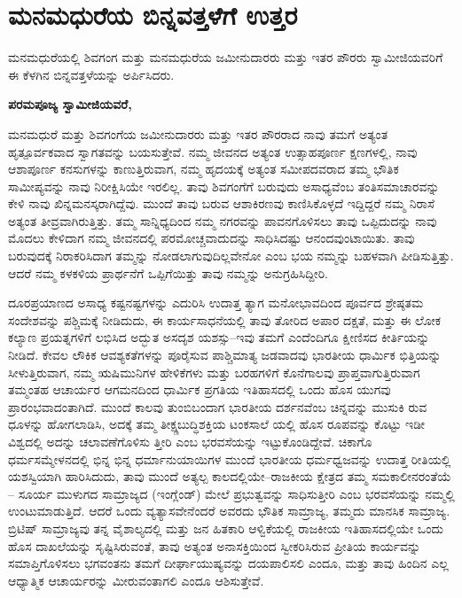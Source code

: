 
\chapter{ಮನಮಧುರೆಯ ಬಿನ್ನವತ್ತಳೆಗೆ ಉತ್ತರ}

ಮನಮಧುರೆಯಲ್ಲಿ ಶಿವಗಂಗ ಮತ್ತು ಮನಮಧುರೆಯ ಜಮೀನುದಾರರು ಮತ್ತು ಇತರ ಪೌರರು ಸ್ವಾಮೀಜಿಯವರಿಗೆ ಈ ಕೆಳಗಿನ ಬಿನ್ನವತ್ತಳೆಯನ್ನು ಅರ್ಪಿಸಿದರು. 

\textbf{ಪರಮಪೂಜ್ಯ ಸ್ವಾಮೀಜಿಯವರೆ, }

ಮನಮಧುರೆ ಮತ್ತು ಶಿವಗಂಗೆಯ ಜಮೀನುದಾರರು ಮತ್ತು ಇತರ ಪೌರರಾದ ನಾವು ತಮಗೆ ಅತ್ಯಂತ ಹೃತ್ಪೂರ್ವಕವಾದ ಸ್ವಾಗತವನ್ನು ಬಯಸುತ್ತೇವೆ. ನಮ್ಮ ಜೀವನದ ಅತ್ಯಂತ ಉತ್ಸಾಹಪೂರ್ಣ ಕ್ಷಣಗಳಲ್ಲಿ, ನಾವು ಆಶಾಪೂರ್ಣ ಕನಸು\-ಗಳನ್ನು ಕಾಣುತ್ತಿರುವಾಗ, ನಮ್ಮ ಹೃದಯಕ್ಕೆ ಅತ್ಯಂತ ಸಮೀಪದವರಾದ ತಮ್ಮ ಭೌತಿಕ ಸಾಮೀಪ್ಯವನ್ನು ನಾವು ನಿರೀಕ್ಷಿಸಿಯೇ ಇರಲಿಲ್ಲ. ತಾವು ಶಿವಗಂಗೆಗೆ ಬರುವುದು ಅಸಾಧ್ಯವೆಂಬ ತಂತಿಸಮಾಚಾರವನ್ನು ಕೇಳಿ ನಾವು ಖಿನ್ನಮನಸ್ಕರಾಗಿದ್ದೆವು. ಮುಂದೆ ತಾವು ಬರುವ ಆಶಾಕಿರಣವು ಕಾಣಿಸಿಕೊಳ್ಳದೆ ಇದ್ದಿದ್ದರೆ ನಮ್ಮ ನಿರಾಸೆ ಅತ್ಯಂತ ತೀವ್ರವಾಗಿರುತ್ತಿತ್ತು. ತಮ್ಮ ಸಾನ್ನಿಧ್ಯದಿಂದ ನಮ್ಮ ನಗರವನ್ನು ಪಾವನಗೊಳಿಸಲು ತಾವು ಒಪ್ಪಿದುದನ್ನು ನಾವು ಮೊದಲು ಕೇಳಿದಾಗ ನಮ್ಮ ಜೀವನದಲ್ಲಿ ಪರಮೋಚ್ಚವಾದುದನ್ನು ಸಾಧಿಸಿದಷ್ಟು ಆನಂದವುಂಟಾಯಿತು. ತಾವು ಬರುವುದಕ್ಕೆ ನಿರಾಕರಿಸಿದಾಗ ತಮ್ಮನ್ನು ನೋಡಲಾಗುವುದಿಲ್ಲವೇನೋ ಎಂಬ ಭಯ ನಮ್ಮನ್ನು ಬಹಳವಾಗಿ ಪೀಡಿಸುತ್ತಿತ್ತು. ಆದರೆ ನಮ್ಮ ಕಳಕಳಿಯ ಪ್ರಾರ್ಥನೆಗೆ ಒಪ್ಪಿಗೆಯಿತ್ತು ತಾವು ನಮ್ಮನ್ನು ಅನುಗ್ರಹಿಸಿದ್ದೀರಿ. 

ದೂರಪ್ರಯಾಣದ ಅಸಾಧ್ಯ ಕಷ್ಟನಷ್ಟಗಳನ್ನು ಎದುರಿಸಿ ಉದಾತ್ತ ತ್ಯಾಗ ಮನೋಭಾವದಿಂದ ಪೂರ್ವದ ಶ್ರೇಷ್ಠತಮ ಸಂದೇಶವನ್ನು ಪಶ್ಚಿಮಕ್ಕೆ ನೀಡಿದುದು, ಈ ಕಾರ್ಯಸಾಧನೆಯಲ್ಲಿ ತಾವು ತೋರಿದ ಅಪಾರ ದಕ್ಷತೆ, ಮತ್ತು ಈ ಲೋಕ ಕಲ್ಯಾಣ ಪ್ರಯತ್ನಗಳಿಗೆ ಲಭಿಸಿದ ಅದ್ಭುತ ಅಸದೃಶ ಯಶಸ್ಸು–ಇವು ತಮಗೆ ಎಂದೆಂದಿಗೂ ಕ್ಷೀಣಿಸದ ಕೀರ್ತಿಯನ್ನು ನೀಡಿದೆ. ಕೇವಲ ಲೌಕಿಕ ಆವಶ್ಯಕತೆಗಳನ್ನು ಪೂರೈಸುವ ಪಾಶ್ಚಿಮಾತ್ಯ ಜಡವಾದವು ಭಾರತೀಯ ಧಾರ್ಮಿಕ ಭಿತ್ತಿಯನ್ನು ಸೀಳುತ್ತಿರುವಾಗ, ನಮ್ಮ ಋಷಿಮುನಿಗಳ ಹೇಳಿಕೆಗಳು ಮತ್ತು ಬರಹಗಳಿಗೆ ಕೊನೆಗಾಲವು ಪ್ರಾಪ್ತವಾಗುತ್ತಿರುವಾಗ ತಮ್ಮಂತಹ ಆಚಾರ್ಯರ ಆಗಮನದಿಂದ ಧಾರ್ಮಿಕ ಪ್ರಗತಿಯ ಇತಿಹಾಸದಲ್ಲಿ ಒಂದು ಹೊಸ ಯುಗವು ಪ್ರಾರಂಭವಾದಂತಾಗಿದೆ. ಮುಂದೆ ಕಾಲವು ತುಂಬಿಬಂದಾಗ ಭಾರತೀಯ ದರ್ಶನವೆಂಬ ಚಿನ್ನವನ್ನು ಮುಸುಕಿ ರುವ ಧೂಳನ್ನು ಹೋಗಲಾಡಿಸಿ, ಅದಕ್ಕೆ ತಮ್ಮ ತೀಕ್ಷ್ಣಬುದ್ಧಿಶಕ್ತಿಯ ಟಂಕಸಾಲೆ ಯಲ್ಲಿ ಹೊಸ ರೂಪವನ್ನು ಕೊಟ್ಟು ಇಡೀ ವಿಶ್ವದಲ್ಲಿ ಅದನ್ನು ಚಲಾವಣೆಗೊಳಿಸು ತ್ತೀರಿ ಎಂಬ ಭರವಸೆಯನ್ನು ಇಟ್ಟುಕೊಂಡಿದ್ದೇವೆ. ಚಿಕಾಗೊ ಧರ್ಮಸಮ್ಮೇಳನದಲ್ಲಿ ಭಿನ್ನ ಭಿನ್ನ ಧರ್ಮಾನುಯಾಯಿಗಳ ಮುಂದೆ ಭಾರತೀಯ ಧರ್ಮಧ್ವಜವನ್ನು ಉದಾತ್ತ ರೀತಿಯಲ್ಲಿ ಯಶಸ್ವಿಯಾಗಿ ಹಾರಿಸಿದುದು, ತಾವು ಮುಂದೆ ಅತ್ಯಲ್ಪ ಕಾಲದಲ್ಲಿಯೇ–ರಾಜಕೀಯ ಕ್ಷೇತ್ರದ ತಮ್ಮ ಸಮ\-ಕಾಲೀನರಂತೆಯೆ – ಸೂರ್ಯ ಮುಳುಗದ ಸಾಮ್ರಾಜ್ಯದ (ಇಂಗ್ಲೆಂಡ್​) ಮೇಲೆ ಪ್ರಭುತ್ವವನ್ನು ಸಾಧಿಸುತ್ತೀರಿ ಎಂಬ ಭರವಸೆಯನ್ನು ನಮ್ಮಲ್ಲಿ ಉಂಟುಮಾಡುತ್ತಿದೆ. ಆದರೆ ಒಂದು ವ್ಯತ್ಯಾಸ\-ವೇನೆಂದರೆ ಅವರದು ಭೌತಿಕ ಸಾಮ್ರಾಜ್ಯ, ತಮ್ಮದು ಮಾನಸಿಕ ಸಾಮ್ರಾಜ್ಯ. ಬ್ರಿಟಿಷ್​ ಸಾಮ್ರಾಜ್ಯವು ತನ್ನ ವೈಶಾಲ್ಯದಲ್ಲಿ ಮತ್ತು ಜನ ಹಿತಕಾರಿ ಆಳ್ವಿಕೆಯಲ್ಲಿ ರಾಜಕೀಯ ಇತಿಹಾಸದಲ್ಲಿಯೇ ಒಂದು ಹೊಸ ದಾಖಲೆಯನ್ನು ಸೃಷ್ಟಿಸಿರುವಂತೆ, ತಾವು ಅತ್ಯಂತ ಅನಾಸಕ್ತಿಯಿಂದ ಸ್ವೀಕರಿಸಿರುವ ಪ್ರೀತಿಯ ಕಾರ್ಯವನ್ನು ಸಮಾಪ್ತಿಗೊಳಿಸಲು ಭಗವಂತನು ತಮಗೆ ದೀರ್ಘಾಯುಷ್ಯವನ್ನು ದಯಪಾಲಿಸಲಿ ಎಂದೂ, ಮತ್ತು ತಾವು ಹಿಂದಿನ ಎಲ್ಲ ಆಧ್ಯಾತ್ಮಿಕ ಆಚಾರ್ಯರನ್ನು ಮೀರುವಂತಾಗಲಿ ಎಂದೂ ಆಶಿಸುತ್ತೇವೆ.

